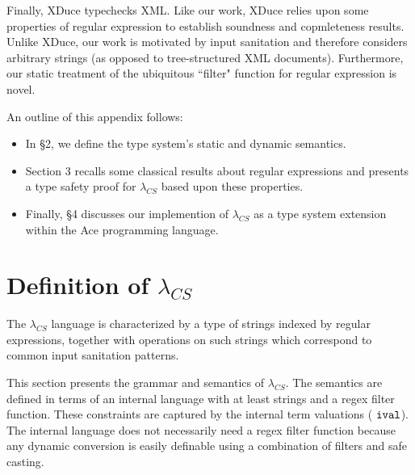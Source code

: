 \documentclass[10pt,preprint]{sigplanconf}
\theoremstyle{definition}
\newcommand{\ival}{ \ {\tt ival} }
\newcommand{\lcs}{\lambda_{CS}}
\begin{document}
Finally, XDuce typechecks XML. Like our work, XDuce relies upon some properties of
regular expression to establish soundness and copmleteness results. Unlike
XDuce, our work is motivated by input sanitation and therefore considers arbitrary
strings (as opposed to tree-structured XML documents). Furthermore, our static
treatment of the ubiquitous ``filter" function for regular expression is novel.

An outline of this appendix follows:

\begin{itemize}
  \item In \S 2, we define the type system's static and dynamic semantics.
  \item Section 3 recalls some classical results about regular expressions and presents a type safety proof for $\lcs$ based upon these properties.
  \item Finally, \S 4 discusses our implemention of $\lcs$ as a type system extension  within the Ace programming language.
\end{itemize}

\section{Definition of $\lcs$}

The $\lcs$ language is characterized by a type of strings indexed by regular
expressions, together with operations on such strings which correspond to common
input sanitation patterns.

This section presents the grammar and semantics of $\lcs$.
The semantics are defined in terms of an internal language with at least strings and a regex filter function.
These constraints are captured by the internal term valuations ($\ival$).
The internal language does not necessarily need a regex filter function because
any dynamic conversion is easily definable using a combination of filters and safe
casting.
\end{document}
